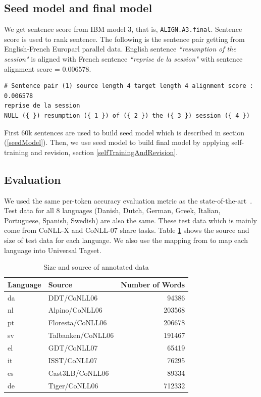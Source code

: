 \subsection{Seed model and final model}
\normalsize
We get sentence score from IBM model 3, that is, \texttt{ALIGN.A3.final}. Sentence score is used to rank sentence.  The following is the sentence pair getting from English-French Europarl parallel data. English sentence \emph{``resumption of the session"} is aligned with French sentence \emph{``reprise de la session"} with sentence alignment score = 0.006578. 


\scriptsize
\begin{lstlisting}
# Sentence pair (1) source length 4 target length 4 alignment score : 0.006578
reprise de la session 
NULL ({ }) resumption ({ 1 }) of ({ 2 }) the ({ 3 }) session ({ 4 }) 
\end{lstlisting}
\normalsize
First 60k sentences are used to build seed model which is described in section (\ref{seedModel}). Then, we use seed model to build final model by applying self-training and revision, section \ref{selfTrainingAndRevision}.

\subsection{Evaluation}
We used the same per-token accuracy evaluation metric as the state-of-the-art~\cite{Das:2011}. Test data for all 8 languages (Danish, Dutch, German, Greek, Italian, Portuguese, Spanish, Swedish) are also the same. These test data which is mainly come from CoNLL-X and CoNLL-07 share tasks. Table \ref{tbl:annotatedData} shows the source and size of test data for each language. We also use the mapping from \cite{UniversalTagSet} to map each language into Universal Tagset. 

\begin{table}
\small
\centering
    \begin{tabular}{lp{3cm}r}
    Language & Source & Number of Words \\
    \hline
    da       & DDT/CoNLL06& 94386           \\
    nl       & Alpino/CoNLL06& 203568          \\
    pt       & Floresta/CoNLL06& 206678          \\
    sv       & Talbanken/CoNLL06& 191467          \\
    el       & GDT/CoNLL07& 65419           \\
    it       & ISST/CoNLL07& 76295           \\
    es       & Cast3LB/CoNLL06& 89334           \\
    de       & Tiger/CoNLL06& 712332          \\
    \end{tabular}
    \caption{Size and source of annotated data}
    \label{tbl:annotatedData}
\end{table}

